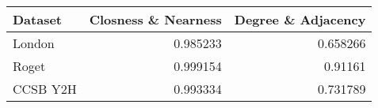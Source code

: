 \begin{center}
\begin{tabular}{lrr}
\hline
 Dataset   &   Closness \& Nearness &   Degree \& Adjacency \\
\hline
 London    &              0.985233 &             0.658266 \\
 Roget     &              0.999154 &             0.91161  \\
 CCSB Y2H  &              0.993334 &             0.731789 \\
\hline
\end{tabular}
\end{center}